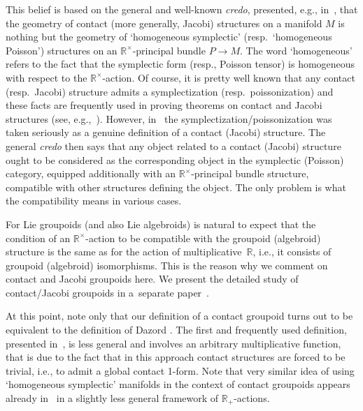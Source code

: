 \documentclass[10pt,a4paper]{amsart}
\numberwithin{equation}{section}
\begin{document}
This belief is based on the general and well-known \emph{credo}, presented, e.g., in~\cite{Grabowski2013}, that the geometry of contact (more generally, Jacobi) structures on a manifold $M$ is nothing but the geometry of `homogeneous symplectic' (resp.\ `homogeneous Poisson') structures on an ${\mathbb R}^\times$-principal bundle $P\to M$. The word `homogeneous' refers to the fact that the symplectic form (resp., Poisson tensor) is homogeneous with respect to the ${\mathbb R}^\times$-action.
Of course, it is pretty well known that any contact (resp.\ Jacobi) structure admits a symplectization (resp.\ poissonization) and these facts are frequently used in proving  theorems on contact and Jacobi structures (see, e.g.,~\cite{Mehta:2013}). However, in~\cite{Grabowski2013} the symplectization/poissonization was taken seriously as a genuine def\/inition of a contact (Jacobi) structure. The general \emph{credo} then says that any object related to a contact (Jacobi) structure ought to be considered  as the corresponding object in the symplectic (Poisson) category, equipped additionally with an ${\mathbb R}^\times$-principal bundle structure, compatible with other structures def\/ining the object. The only problem is what the compatibility means in various cases.

For Lie groupoids (and also Lie algebroids) is natural to expect that the condition of an ${\mathbb R}^\times$-action to be compatible with the groupoid (algebroid) structure is the same as for the action of multiplicative~${\mathbb R}$, i.e., it consists of groupoid (algebroid) isomorphisms. This is the reason why we comment on contact and Jacobi groupoids here. We present the  detailed study of contact/Jacobi groupoids in a~separate paper~\cite{Bruce:2015}.

At this point, note only  that our def\/inition of a contact groupoid turns out to be equivalent to the def\/inition of Dazord \cite{Dazord:1995}. The f\/irst and frequently used def\/inition, presented in~\cite{Kerbrat:1993}, is less general and involves an arbitrary multiplicative function, that is due to the fact that in this approach contact structures are forced to be trivial, i.e., to admit a global contact 1-form. Note that very similar idea of using `homogeneous symplectic' manifolds in the context of contact groupoids appears already in~\cite{Crainic:2007} in a slightly less general framework of ${\mathbb R}_+$-actions.
\end{document}

